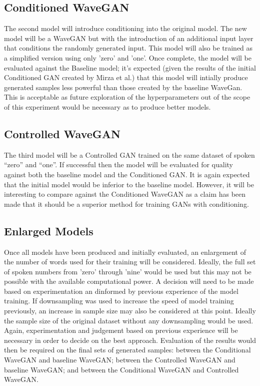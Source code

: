 \documentclass[titlepage]{article}
\begin{document}
\subsection{Conditioned WaveGAN}

The second model will introduce conditioning into the original model.
The new model will be a WaveGAN but with the introduction of an additional input layer that conditions the randomly generated input.
This model will also be trained as a simplified version using only 'zero' and 'one'.
\newline
\newline
Once complete, the model will be evaluated against the Baseline model; it's expected (given the results of the initial Conditioned GAN created by Mirza et al.) that this model will intially produce generated samples less powerful than those created by the baseline WaveGan.
This is acceptable as future exploration of the hyperparameters out of the scope of this experiment would be necessary as to produce better models.

\subsection{Controlled WaveGAN}

The third model will be a Controlled GAN trained on the same dataset of spoken ``zero'' and ``one''.
If successful then the model will be evaluated for quality against both the baseline model and the Conditioned GAN.
It is again expected that the initial model would be inferior to the baseline model.
However, it will be interesting to compare against the Conditioned WaveGAN as a claim has been made that it should be a superior method for training GANs with conditioning.

\subsection{Enlarged Models}

Once all models have been produced and initially evaluated, an enlargement of the number of words used for their training will be considered.
Ideally, the full set of spoken numbers from 'zero' through 'nine' would be used but this may not be possible with the available computational power.
A decision will need to be made based on experimentation an dinformed by previous experience of the model training.
\newline
\newline
If downsampling was used to increase the speed of model training previously, an increase in sample size may also be considered at this point.
Ideally the sample size of the original dataset without any downsampling would be used.
Again, experimentation and judgement based on previous experience will be necessary in order to decide on the best approach.
\newline
\newline
Evaluation of the results would then be required on the final sets of generated samples: between the Conditional WaveGAN and baseline WaveGAN; between the Controlled WaveGAN and baseline WaveGAN; and between the Conditional WaveGAN and Controlled WaveGAN.
\end{document}
